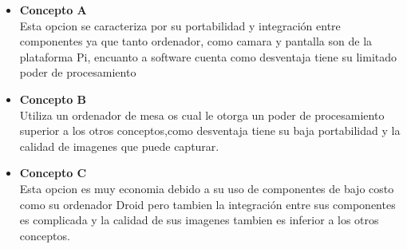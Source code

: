 \begin{itemize}
	\item \textbf{Concepto A}\\
	Esta opcion se caracteriza por su portabilidad y integración entre componentes ya que tanto ordenador, como camara y pantalla son de la plataforma Pi, encuanto a software cuenta como desventaja tiene su limitado poder de procesamiento
	\item \textbf{Concepto B}\\
	Utiliza un ordenador de mesa os cual le otorga  un poder de procesamiento superior a los otros conceptos,como desventaja tiene su baja portabilidad y la calidad de imagenes que puede capturar.
	\item \textbf{Concepto C}\\
	Esta opcion es muy economia debido a su uso de componentes de bajo costo como su ordenador Droid pero tambien la integración entre sus componentes es complicada y la calidad de sus imagenes tambien es inferior a los otros conceptos.
\end{itemize}

